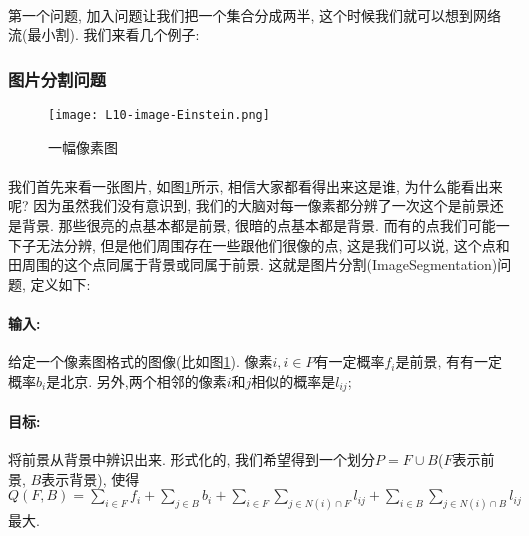 \documentclass[a4paper]{article}
\renewcommand{\figurename}{图}
\begin{document}
        \paragraph{} 第一个问题, 加入问题让我们把一个集合分成两半, 这个时候我们就可以想到网络流(最小割). 我们来看几个例子:
        \subsubsection{图片分割问题}
\begin{figure}[h]
                 \centering
                 \texttt{[image: L10-image-Einstein.png]}
                 \caption{一幅像素图}
                 \label{Figure: image_segmentation_einstein_pixel}
             \end{figure}
\paragraph{}我们首先来看一张图片, 如\figurename\ref{Figure: image_segmentation_einstein_pixel}所示, 相信大家都看得出来这是谁, 为什么能看出来呢? 因为虽然我们没有意识到, 我们的大脑对每一像素都分辨了一次这个是前景还是背景. 那些很亮的点基本都是前景, 很暗的点基本都是背景. 而有的点我们可能一下子无法分辨, 但是他们周围存在一些跟他们很像的点, 这是我们可以说, 这个点和田周围的这个点同属于背景或同属于前景. 这就是图片分割({\sc ImageSegmentation})问题, 定义如下:
            \paragraph{输入:} 给定一个像素图格式的图像(比如\figurename\ref{Figure: image_segmentation_einstein_pixel}). 像素$i, i\in P$有一定概率$f_i$是前景, 有有一定概率$b_i$是北京. 另外,两个相邻的像素$i$和$j$相似的概率是$l_{ij}$;
            \paragraph{目标:}将前景从背景中辨识出来. 形式化的, 我们希望得到一个划分$P=F\cup B$($F$表示前景, $B$表示背景), 使得$Q(F, B) = \sum_{i\in F} f_i + \sum_{j\in B} b_i + \sum_{i \in F}\sum_{j \in N(i)\cap F} l_{ij} + \sum_{i \in B}\sum_{j \in N(i)\cap B} l_{ij}$最大.
\end{document}
